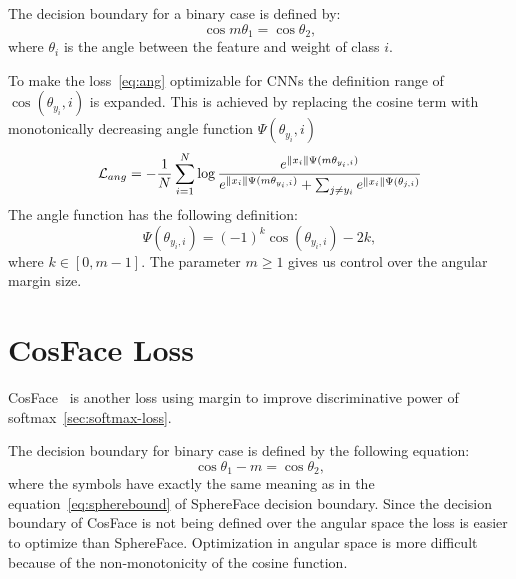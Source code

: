 The decision boundary for a binary case is defined by:
\begin{equation}
    \label{eq:spherebound}
    \cos{m\theta_1} = \cos{\theta_2},
\end{equation}
where $\theta_i$ is the angle between the feature and weight of class $i$.

To make the loss~\ref{eq:ang} optimizable for CNNs the definition range of $\cos(\theta_{y_i},i)$ is expanded.
This is achieved by replacing the cosine term with monotonically decreasing angle function $\Psi(\theta_{y_i},i)$
\begin{equation}
    \mathcal{L}_{ang} = -\frac{1}{N} \sum_{i=1}^{N} \log \frac{e^{\left\lVert x_i\right\rVert \Psi(m\theta_{y_i,i})}}
    {e^{\left\lVert x_i\right\rVert \Psi(m\theta_{y_i,i})} + \sum_{j \neq y_i} e^{\left\lVert x_{i}\right\rVert \Psi(\theta_{j,i})}}
\end{equation}
The angle function has the following definition:
\begin{equation}
    \Psi(\theta_{y_i,i}) = (-1)^{k} \cos(\theta_{y_{i},i}) -2k,
\end{equation}
where $k \in \left[ 0, m-1 \right]$.
The parameter $m \geq 1$ gives us control over the angular margin size.

\section{CosFace Loss}\label{sec:cosface}
CosFace~\cite{CosFace} is another loss using margin to improve discriminative power of softmax~\ref{sec:softmax-loss}.

The decision boundary for binary case is defined by the following equation:
\begin{equation}
    \label{eq:cosbounary}
    \cos{\theta_1} - m = \cos{\theta_2},
\end{equation}
where the symbols have exactly the same meaning as in the equation~\ref{eq:spherebound} of SphereFace decision boundary.
Since the decision boundary of CosFace is not being defined over the angular space the loss is easier to optimize than
SphereFace.
Optimization in angular space is more difficult because of the non-monotonicity of the cosine function.

